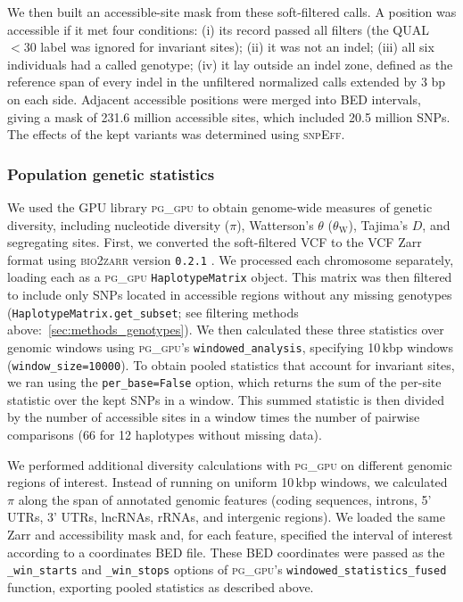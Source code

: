 We then built an accessible-site mask from these soft-filtered calls.
A position was accessible if it met four conditions:
(i) its record passed all filters (the QUAL $<30$ label was ignored for invariant sites);
(ii) it was not an indel;
(iii) all six individuals had a called genotype;
(iv) it lay outside an indel zone, defined as the reference span of every indel in
the unfiltered normalized calls extended by 3 bp on each side.
Adjacent accessible positions were merged into BED intervals, giving a mask of 231.6 million
accessible sites, which included 20.5 million SNPs.
The effects of the kept variants was determined using \textsc{snpEff}.

\subsubsection*{Population genetic statistics}

We used the GPU library \textsc{pg\_gpu} \citep[commit \texttt{0fb9a24};][]{pope_gpu_2026}
to obtain genome-wide measures of genetic diversity, including nucleotide diversity ($\pi$),
Watterson's $\theta$ ($\theta_\text{W}$), Tajima's $D$, and segregating sites.
First, we converted the soft-filtered VCF to the VCF Zarr format using \textsc{bio2zarr} version
\texttt{0.2.1} \citep{czech_analysis-ready_2025}.
We processed each chromosome separately, loading each as a \textsc{pg\_gpu}
\texttt{HaplotypeMatrix} object.
This matrix was then filtered to include only SNPs located in accessible regions
without any missing genotypes (\texttt{HaplotypeMatrix.get\_subset};
see filtering methods above:~\ref{sec:methods_genotypes}).
We then calculated these three statistics over genomic windows using \textsc{pg\_gpu}'s
\texttt{windowed\_analysis}, specifying 10\,kbp windows (\texttt{window\_size=10000}).
To obtain pooled statistics that account for invariant sites, we ran using the
\texttt{per\_base=False} option, which returns the sum of the per-site statistic over the
kept SNPs in a window.
This summed statistic is then divided by the number of accessible sites in a window
times the number of pairwise comparisons (66 for 12 haplotypes without missing data).
\vspace{0.1cm}

We performed additional diversity calculations with \textsc{pg\_gpu} on different genomic
regions of interest.
Instead of running on uniform 10\,kbp windows, we calculated $\pi$ along the
span of annotated genomic features (coding sequences, introns, 5' UTRs, 3' UTRs, lncRNAs,
rRNAs, and intergenic regions).
We loaded the same Zarr and accessibility mask and, for each feature, specified the interval
of interest according to a coordinates BED file.
These BED coordinates were passed as the \texttt{\_win\_starts} and \texttt{\_win\_stops}
options of \textsc{pg\_gpu}'s \texttt{windowed\_statistics\_fused} function, exporting
pooled statistics as described above.
\vspace{0.1cm}

